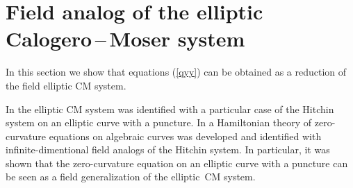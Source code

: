 \documentclass[a4paper,11pt]{article}
\theoremstyle{plain}
\theoremstyle{remark}
\begin{document}
\section{Field analog of the elliptic Calogero\,--\,Moser system}

In this section we show that equations (\ref{qyy}) can be obtained
as a reduction of the field elliptic CM system.

In \cite{n} the elliptic CM system was identified with a particular case
of the Hitchin system on an elliptic curve with a puncture. In \cite{krvb}
a Hamiltonian theory of zero-curvature equations on algebraic curves was
developed and identified with infinite-dimentional field analogs of the
Hitchin system.
In particular, it was shown that the zero-curvature equation on an
elliptic curve with a puncture can be seen as a field generalization
of the elliptic~CM system.
\end{document}
